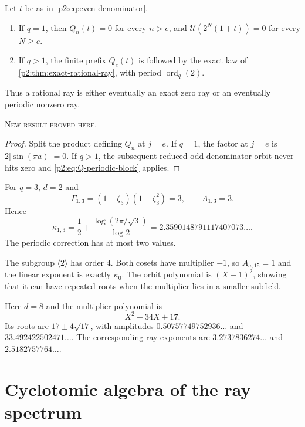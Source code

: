 \documentclass[11pt,oneside]{article}
\theoremstyle{definition}
\theoremstyle{remark}
\newcommand{\ord}{\operatorname{ord}}
\newcommand{\newresult}{\textcolor{newgreen}{\textsc{New result proved here.}}}
\begin{document}
\begin{corollary}\label{p2:cor:all-rational-rays}
Let $t$ be as in \eqref{p2:eq:even-denominator}.
\begin{enumerate}
 \item If $q=1$, then $Q_n(t)=0$ for every $n>e$, and
 $\mathscr U(2^N(1+t))=0$ for every $N\ge e$.
 \item If $q>1$, the finite prefix $Q_e(t)$ is followed by the exact law of
 \cref{p2:thm:exact-rational-ray}, with period $\ord_q(2)$.
\end{enumerate}
Thus a rational ray is either eventually an exact zero ray or an eventually
periodic nonzero ray.

\smallskip\noindent\newresult
\end{corollary}

\begin{proof}
Split the product defining $Q_n$ at $j=e$. If $q=1$, the factor at $j=e$ is
$2|\sin(\pi a)|=0$. If $q>1$, the subsequent reduced odd-denominator orbit never
hits zero and \eqref{p2:eq:Q-periodic-block} applies.
\end{proof}

\begin{example}
For $q=3$, $d=2$ and
\[
 \Gamma_{1,3}=(1-\zeta_3)(1-\zeta_3^2)=3,
 \qquad A_{1,3}=3.
\]
Hence
\[
 \kappa_{1,3}=\frac12+\frac{\log(2\pi/\sqrt3)}{\log2}
 =2.3590148791117407073\ldots.
\]
The periodic correction has at most two values.
\end{example}

\begin{example}[A neutral cycle at $q=15$]
The subgroup $\langle2\rangle$ has order $4$. Both cosets have multiplier $-1$,
so $A_{a,15}=1$ and the linear exponent is exactly $\kappa_0$. The orbit polynomial
is $(X+1)^2$, showing that it can have repeated roots when the multiplier lies in
a smaller subfield.
\end{example}

\begin{example}[The first visible split at $q=17$]
Here $d=8$ and the multiplier polynomial is
\[
 X^2-34X+17.
\]
Its roots are $17\pm4\sqrt{17}$, with amplitudes
$0.50757749752936\ldots$ and $33.492422502471\ldots$. The corresponding ray
exponents are $3.2737836274\ldots$ and $2.5182757764\ldots$.
\end{example}

\section{Cyclotomic algebra of the ray spectrum}\label{p2:sec:cyclotomic-algebra}
\end{document}
